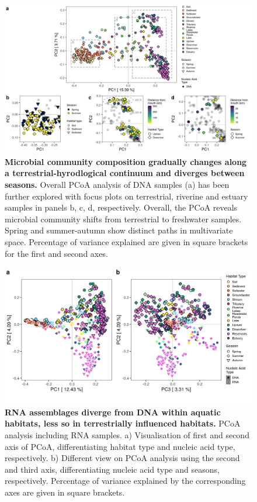 \documentclass[12pt,a4paper]{article} %
\begin{document}
\begin{figure}[!ht]
\centering
\includegraphics[width=16cm]{../../Figures/Final/PCoA_hellin_DNA_collage.png}
\caption{\textbf{Microbial community composition gradually changes along a terrestrial-hyrodlogical continuum and diverges between seasons.} Overall PCoA analysis of DNA samples (a) has been further explored with focus plots on terrestrial, riverine and estuary samples in panels b, c, d, respectively. Overall, the PCoA reveals microbial community shifts from terrestrial to freshwater samples. Spring and summer-autumn show distinct paths in multivariate space. Percentage of variance explained are given in square brackets for the first and second axes.}
\end{figure}

\begin{figure}[!ht]
\centering
\includegraphics[width=17cm]{../../Figures/Final/PCoA_all_SampleType.png}
\caption{\textbf{RNA assemblages diverge from DNA within aquatic habitats, less so in terrestrially influenced habitats.} PCoA analysis including RNA samples. a) Visualisation of first and second axis of PCoA, differentiating habitat type and nucleic acid type, respectively. b) Different view on PCoA analysis using the second and third axis, differentiating nucleic acid type and seasons, respectively. Percentage of variance explained by the corresponding axes are given in square brackets.}
\end{figure}
\end{document}
